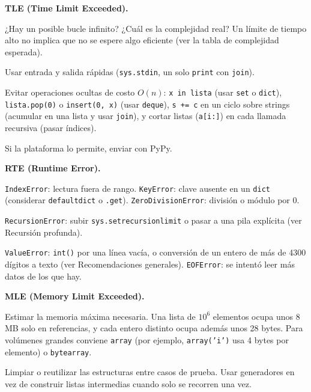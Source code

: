 \textbf{TLE (Time Limit Exceeded).}
\begin{props}
  \item ¿Hay un posible bucle infinito? ¿Cuál es la complejidad real? Un límite de tiempo alto no implica que no se espere algo eficiente (ver la tabla de complejidad esperada).
  \item Usar entrada y salida rápidas (\texttt{sys.stdin}, un solo \texttt{print} con \texttt{join}).
  \item Evitar operaciones ocultas de costo \(O(n)\): \texttt{x in lista} (usar \texttt{set} o \texttt{dict}), \texttt{lista.pop(0)} o \texttt{insert(0, x)} (usar \texttt{deque}), \texttt{s += c} en un ciclo sobre strings (acumular en una lista y usar \texttt{join}), y cortar listas (\texttt{a[i:]}) en cada llamada recursiva (pasar índices).
  \item Si la plataforma lo permite, enviar con PyPy.
\end{props}

\textbf{RTE (Runtime Error).}
\begin{props}
  \item \texttt{IndexError}: lectura fuera de rango. \texttt{KeyError}: clave ausente en un \texttt{dict} (considerar \texttt{defaultdict} o \texttt{.get}). \texttt{ZeroDivisionError}: división o módulo por 0.
  \item \texttt{RecursionError}: subir \texttt{sys.setrecursionlimit} o pasar a una pila explícita (ver Recursión profunda).
  \item \texttt{ValueError}: \texttt{int(\textquotesingle\textquotesingle)} por una línea vacía, o conversión de un entero de más de 4300 dígitos a texto (ver Recomendaciones generales). \texttt{EOFError}: se intentó leer más datos de los que hay.
\end{props}

\textbf{MLE (Memory Limit Exceeded).}
\begin{props}
  \item Estimar la memoria máxima necesaria. Una lista de \(10^6\) elementos ocupa unos 8 MB solo en referencias, y cada entero distinto ocupa además unos 28 bytes. Para volúmenes grandes conviene \texttt{array} (por ejemplo, \texttt{array('i')} usa 4 bytes por elemento) o \texttt{bytearray}.
  \item Limpiar o reutilizar las estructuras entre casos de prueba. Usar generadores en vez de construir listas intermedias cuando solo se recorren una vez.
\end{props}
